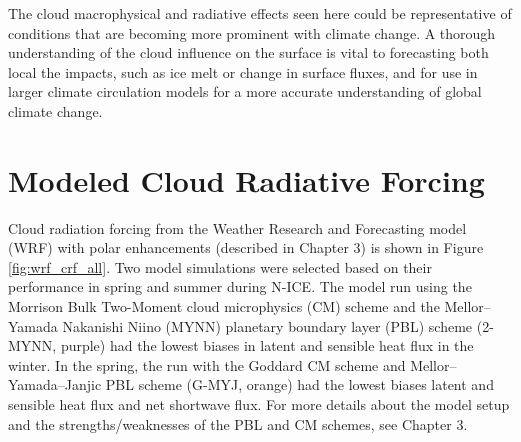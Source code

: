 The cloud macrophysical and radiative effects seen here could be representative of conditions that are becoming more prominent with climate change. A thorough understanding of the cloud influence on the surface is vital to forecasting both local the impacts, such as ice melt or change in surface fluxes, and for use in larger climate circulation models for a more accurate understanding of global climate change. 

\section{Modeled Cloud Radiative Forcing}
Cloud radiation forcing from the Weather Research and Forecasting model (WRF) with polar enhancements (described in Chapter 3) is shown in Figure \ref{fig:wrf_crf_all}. Two model simulations were selected based on their performance in spring and summer during N-ICE. The model run using the Morrison Bulk Two-Moment cloud microphysics (CM) scheme and the Mellor–Yamada Nakanishi Niino (MYNN) planetary boundary layer (PBL) scheme (2-MYNN, purple) had the lowest biases in latent and sensible heat flux in the winter. In the spring, the run with the Goddard CM scheme and Mellor–Yamada–Janjic PBL scheme (G-MYJ, orange) had the lowest biases latent and sensible heat flux and net shortwave flux. For more details about the model setup and the strengths/weaknesses of the PBL and CM schemes, see Chapter 3.

